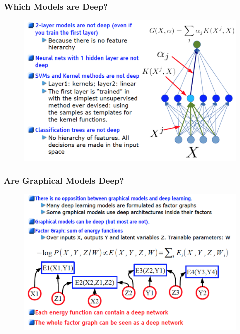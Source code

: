 \documentclass{beamer}
\begin{document}
\begin{frame}
\frametitle{Which Models are Deep?}
\begin{figure}
      \includegraphics[width=1\textwidth]{figs/intro9.png}
\end{figure}
\end{frame}

\begin{frame}
\frametitle{Are Graphical Models Deep?}
\begin{figure}
      \includegraphics[width=1\textwidth]{figs/intro10.png}
\end{figure}
\end{frame}
\end{document}
